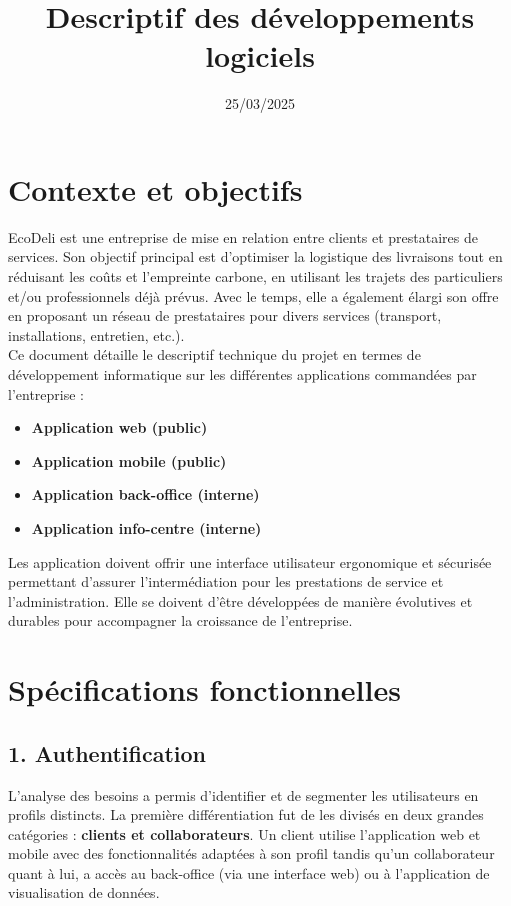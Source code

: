 \documentclass{report}
\title{Descriptif des développements logiciels}
\date{25/03/2025}
\begin{document}
\maketitle

\section*{\centering Contexte et objectifs}
\vspace{0.5cm}
\noindent EcoDeli est une entreprise de mise en relation entre clients et prestataires de services. Son objectif principal est d’optimiser la logistique des livraisons tout en réduisant les coûts et l’empreinte carbone, en utilisant les trajets des particuliers et/ou professionnels déjà prévus. Avec le temps, elle a également élargi son offre en proposant un réseau de prestataires pour divers services (transport, installations, entretien, etc.). \\

\noindent Ce document détaille le descriptif technique du projet en termes de développement informatique sur les différentes applications commandées par l’entreprise :
\begin{itemize}
    \item \textbf{Application web (public)}
    \item \textbf{Application mobile (public)}
    \item \textbf{Application back-office (interne)}
    \item \textbf{Application info-centre (interne)}
\end{itemize}
\vspace{0.4cm}
\noindent Les application doivent offrir une interface utilisateur ergonomique et sécurisée permettant d’assurer l’intermédiation pour les prestations de service et l'administration. Elle se doivent d'être développées de manière évolutives et durables pour accompagner la croissance de l’entreprise. 
\vspace{1cm}

\section*{\centering Spécifications fonctionnelles}
\vspace{0.5cm}
\subsection*{1. Authentification}
\vspace{0.2cm}
\noindent L’analyse des besoins a permis d’identifier et de segmenter les utilisateurs en profils distincts. La première différentiation fut de les divisés en deux grandes catégories : \textbf{clients et collaborateurs}. Un client utilise l’application web et mobile avec des fonctionnalités adaptées à son profil tandis qu'un collaborateur quant à lui, a accès au back-office (via une interface web) ou à l’application de visualisation de données. \\
\end{document}
